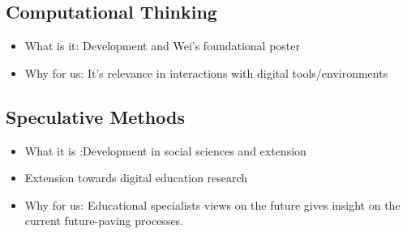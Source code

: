 \documentclass[sn-mathphys, Numbered]{sn-jnl}%
\theoremstyle{thmstyleone}%
\theoremstyle{thmstyletwo}%
\theoremstyle{thmstylethree}%
\begin{document}
\subsection{Computational Thinking}\label{Computational Thinking}

\begin{itemize}
    \item What is it: Development and Wei's foundational poster
    \item Why for us: It's relevance in interactions with digital tools/environments
\end{itemize}

\subsection{Speculative Methods}\label{Speculative Methods}

\begin{itemize}
    \item What it is :Development in social sciences and extension
    \item  Extension towards digital education research
    \item Why for us: Educational specialists views on the future gives insight on the current future-paving processes.
\end{itemize}
\end{document}
